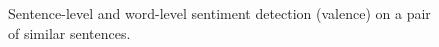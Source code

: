 \begin{figure}[!htbp]
    \centering
    \caption{Sentence-level and word-level sentiment detection (valence) on a pair of similar sentences.}
    \label{fig:example_sentiment}
\end{figure}

